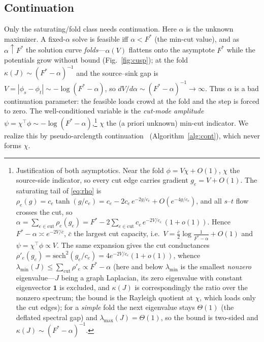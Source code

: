 \documentclass{siamart220329}
\begin{document}
\subsection{Continuation}\label{sec:continuation}
Only the saturating/fold class needs continuation. Here $\alpha$ is the unknown maximizer. A fixed-$\alpha$ solve is
feasible iff $\alpha<F^*$ (the min-cut value), and as $\alpha\uparrow F^*$ the solution curve
\emph{folds}---$\alpha(V)$ flattens onto the asymptote $F^*$ while the potentials grow without
bound (Fig.~\ref{fig:cusp}); at the fold $\kappa(J)\sim(F^*-\alpha)^{-1}$ and the source--sink gap
is $V=|\phi_s-\phi_t|\sim-\log(F^*-\alpha)$, so $dV/d\alpha\sim(F^*-\alpha)^{-1}\to\infty$.
Thus $\alpha$ is a bad continuation parameter: the feasible loads crowd at the fold and the step is forced to zero. The well-conditioned
variable is the \emph{cut-mode amplitude}
$\psi=\chi^{\top}\phi\sim-\log(F^*-\alpha)$,\footnote{Justification of both asymptotics. Near the fold
$\phi=V\chi+O(1)$, $\chi$ the source-side indicator, so every cut edge carries gradient
$g_e=V+O(1)$. The saturating tail of \eqref{eq:rho} is
$\rho_e(g)=c_e\tanh(g/c_e)=c_e-2c_e\,e^{-2g/c_e}+O(e^{-4g/c_e})$, and all $s$--$t$ flow crosses the
cut, so $\alpha=\sum_{e\in\mathrm{cut}}\rho_e(g_e)=F^*-2\sum_{e\in\mathrm{cut}}c_e\,
e^{-2V/c_e}\,(1+o(1))$. Hence $F^*-\alpha\asymp e^{-2V/\bar c}$, $\bar c$ the largest cut capacity,
i.e.\ $V=\tfrac{\bar c}{2}\log\tfrac{1}{F^*-\alpha}+O(1)$ and $\psi=\chi^{\top}\phi\propto V$. The
same expansion gives the cut conductances
$\rho'_e(g_e)=\mathrm{sech}^2(g_e/c_e)=4e^{-2V/c_e}(1+o(1))$, whence
$\lambda_{\min}(J)\le\sum_{\mathrm{cut}}\rho'_e\propto F^*-\alpha$ (here and below $\lambda_{\min}$
is the smallest \emph{nonzero} eigenvalue---$J$ being a graph Laplacian, its zero eigenvalue with
constant eigenvector $\mathbf 1$ is excluded, and $\kappa(J)$ is correspondingly the ratio over the
nonzero spectrum; the bound is the Rayleigh quotient at $\chi$,
which loads only the cut edges); for a \emph{simple} fold the next eigenvalue stays $\Theta(1)$ (the
deflated spectral gap) and $\lambda_{\max}(J)=\Theta(1)$, so the bound is two-sided and
$\kappa(J)\sim(F^*-\alpha)^{-1}$.}
$\chi$ the (a priori unknown) min-cut indicator. We realize this by pseudo-arclength
continuation~\cite{keller,allgower-georg} (Algorithm~\ref{alg:cont}), which never forms
$\chi$.
\end{document}
